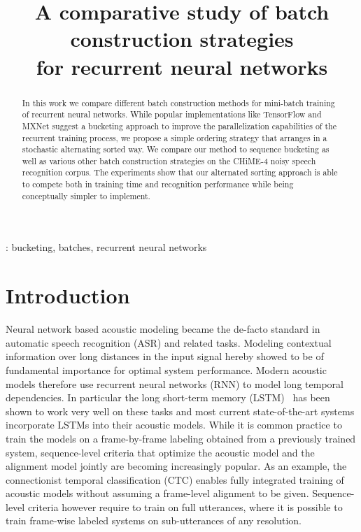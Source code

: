 \documentclass{article}
\title{A comparative study of batch construction strategies \\
	 for recurrent neural networks}
\begin{document}
  \maketitle
  \begin{abstract}
  	 In this work we compare different batch construction methods for mini-batch training
  	 of recurrent neural networks. While popular implementations like TensorFlow and MXNet suggest 
  	 a bucketing approach to improve the parallelization capabilities of the recurrent training process, 
  	 we propose a simple ordering strategy that arranges in a stochastic alternating sorted way. We compare our method to sequence bucketing as well as various other
  	 batch construction strategies on the CHiME-4 noisy speech recognition corpus. The experiments
  	 show that our alternated sorting approach is able to compete both in training time and recognition performance while being conceptually simpler to implement. 
  \end{abstract}
  : bucketing, batches, recurrent neural networks

  \section{Introduction}
  	Neural network based acoustic modeling became the de-facto standard in automatic speech recognition (ASR)
  	and related tasks. Modeling contextual information over long distances in the input signal hereby showed to 
  	be of fundamental importance for optimal system performance. Modern acoustic models therefore use recurrent 
  	neural networks (RNN) to model long temporal dependencies. In particular the long short-term memory (LSTM)~\cite{hochreiter1997lstm}
  	has been shown to work very well on these tasks and most current state-of-the-art systems incorporate LSTMs
  	into their acoustic models. While it is common practice to train the
  	models on a frame-by-frame labeling obtained from a 
  	previously trained system, sequence-level criteria that optimize the acoustic model and the alignment model jointly
  	are becoming increasingly popular. As an example, the connectionist temporal classification (CTC) \cite{CTC}
  	enables fully integrated training of acoustic models without assuming a frame-level alignment to be given. Sequence-level
  	criteria however require to train on full utterances, where it is possible to train frame-wise labeled systems
  	on sub-utterances of any resolution.
  	
\end{document}
